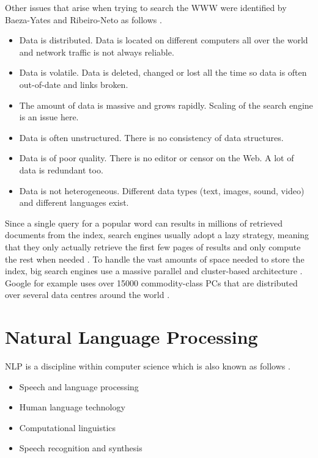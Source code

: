 Other issues that arise when trying to search the \ac{WWW} were identified by Baeza-Yates and Ribeiro-Neto as follows \autocite*{Baeza-Yates2011}.

\begin{itemize}
  \item Data is distributed. Data is located on different computers all over the world and network traffic is not always reliable.
  \item Data is volatile. Data is deleted, changed or lost all the time so data is often out-of-date and links broken.
  \item The amount of data is massive and grows rapidly. Scaling of the search engine is an issue here.
  \item Data is often unstructured. There is no consistency of data structures.
  \item Data is of poor quality. There is no editor or censor on the Web. A lot of data is redundant too.
  \item Data is not heterogeneous. Different data types (text, images, sound, video) and different languages exist.
\end{itemize}

Since a single query for a popular word can results in millions of retrieved documents from the index, search engines usually adopt a lazy strategy, meaning that they only actually retrieve the first few pages of results and only compute the rest when needed \autocite{Baeza-Yates2011}. To handle the vast amounts of space needed to store the index, big search engines use a massive parallel and cluster-based architecture \autocite{Baeza-Yates2011}. Google for example uses over \num{15000} commodity-class PCs that are distributed over several data centres around the world \autocite{Dean2003}.


\section{Natural Language Processing}
\label{s:nlp}

\acf{NLP} is a discipline within computer science which is also known as follows \autocite{Jurafsky2009}.

\begin{itemize}
  \item Speech and language processing
  \item Human language technology
  \item Computational linguistics
  \item Speech recognition and synthesis
\end{itemize}

